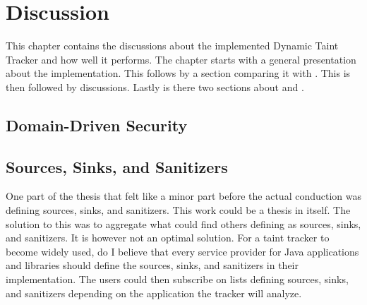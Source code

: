 \chapter{Discussion}
This chapter contains the discussions about the implemented Dynamic Taint Tracker and how well it performs. The chapter starts with a general presentation about the implementation. This follows by a section comparing it with \textit{}. This is then followed by \textit{} discussions. Lastly is there two sections about \textit{} and \textit{}.


\section{Domain-Driven Security}
\label{security}

\section{Sources, Sinks, and Sanitizers}
\label{sss}
One part of the thesis that felt like a minor part before the actual conduction was defining sources, sinks, and sanitizers. This work could be a thesis in itself. The solution to this was to aggregate what could find others defining as sources, sinks, and sanitizers. It is however not an optimal solution. For a taint tracker to become widely used, do I believe that every service provider for Java applications and libraries should define the sources, sinks, and sanitizers in their implementation. The users could then subscribe on lists defining sources, sinks, and sanitizers depending on the application the tracker will analyze.

